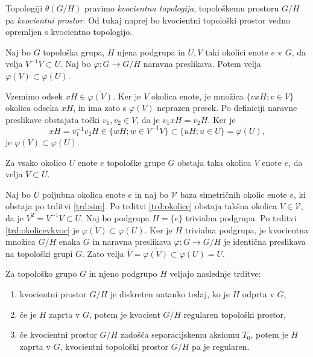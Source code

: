 \documentclass[mat1]{fmfdelo}
\newcommand{\closure}[1]{\overline{#1}}
\begin{document}
Topologiji $\theta(G/H)$ pravimo \emph{kvocientna topologija}, topološkemu prostoru $G/H$ pa \emph{kvocientni prostor}. Od tukaj naprej bo kvocientni topološki prostor vedno opremljen s kvocientno topologijo.

\begin{trditev}\label{trd:okolicevkvoc}
Naj bo $G$ topološka grupa, $H$ njena podgrupa in $U, V$ taki okolici enote $e$ v $G$, da velja $V^{-1}V \subset U$. Naj bo $\varphi: G \to G/H$ naravna preslikava. Potem velja $\closure{\varphi(V)} \subset \varphi(U)$.
\end{trditev}

\begin{dokaz}
Vzemimo odsek $xH \in \closure{\varphi(V)}$. Ker je $V$ okolica enote, je množica $\lbrace vxH ; v \in V \rbrace$ okolica odseka $xH$, in ima zato s $\varphi(V)$ neprazen presek. Po definiciji naravne preslikave obstajata točki $v_1, v_2 \in V$, da je $v_1xH = v_2H$. Ker je \[xH = v_1^{-1}v_2H \in \lbrace wH ; w \in V^{-1}V \rbrace \subset \lbrace uH ; u \in U \rbrace = \varphi(U), \]
je $\closure{\varphi(V)} \subset \varphi(U)$.
\end{dokaz}

\begin{posledica}\label{pos:sim}
Za vsako okolico $U$ enote $e$ topološke grupe $G$ obstaja taka okolica $V$ enote $e$, da velja $\closure{V} \subset U$.
\end{posledica}

\begin{dokaz}
Naj bo $U$ poljubna okolica enote $e$ in naj bo $\mathcal{V}$ baza simetričnih okolic enote $e$, ki obstaja po trditvi \ref{trd:sim}. Po trditvi \ref{trd:okolice} obstaja takšna okolica $V \in \mathcal{V}$, da je $V^2 = V^{-1}V \subset U$. Naj bo podgrupa $H = \lbrace e \rbrace$ trivialna podgrupa. Po trditvi \ref{trd:okolicevkvoc} je $\closure{\varphi(V)} \subset \varphi(U)$. Ker je $H$ trivialna podgrupa, je kvocientna množica $G/H$ enaka $G$ in naravna preslikava $\varphi\colon G \to G/H$ je identična preslikava na topološki grupi $G$. Zato velja $\closure{V} = \closure{\varphi(V)} \subset \varphi(U) = U$.
\end{dokaz}

\begin{izrek}\label{izr:kvocreg}
Za topološko grupo $G$ in njeno podgrupo $H$ veljajo naslednje trditve:
\begin{enumerate}
\item kvocientni prostor $G/H$ je diskreten natanko tedaj, ko je $H$ odprta v $G$,\label{podtrd:kvocreg1}
\item če je $H$ zaprta v $G$, potem je kvocient $G/H$ regularen topološki prostor,\label{podtrd:kvocreg2}
\item če kvocientni prostor $G/H$ zadošča separacijskemu aksiomu $T_0$, potem je $H$ zaprta v $G$, kvocientni topološki prostor $G/H$ pa je regularen.\label{podtrd:kvocreg3}
\end{enumerate}
\end{izrek}
\end{document}
